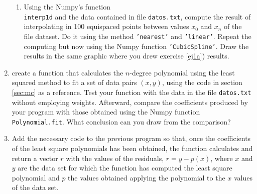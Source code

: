 \begin{paracol}{2}
\begin{enumerate}
\begin{enumerate}
	\item Using the Numpy's function\\ \texttt{interp1d} and the data contained in file \texttt{datos.txt}, compute the result of interpolating in 100 equispaced points between values $x_0$ and $x_n$ of the file dataset. Do it using the method \texttt{'nearest'} and \texttt{'linear'}. Repeat the computing but now using the  Numpy function   \texttt{'CubicSpline'}. Draw the results in the same graphic where you drew exercise \ref{ej1a}) results.  
\end{enumerate}
\item create a function that calculates the $n$-degree polynomial using the least squared method to fit a set of data pairs $(x,y)$, using the code in section \ref{sec:mc} as a reference. Test your function with the data in the file \texttt{datos.txt} without employing weights. Afterward, compare the coefficients produced by your program with those obtained using the Numpy function \texttt{Polynomial.fit}. What conclusion can you draw from the comparison?

\item Add the necessary code to the previous program so that, once the coefficients of the least square polynomials has been obtained, the function calculates and return a vector $r$ with the values of the residuals, $r = y -p(x)$, where $x$ and $y$ are the data set for which the function has computed the least square polynomial and $p$ the values obtained applying the polynomial to the $x$ values of the data set.
\end{enumerate}
\end{paracol}
